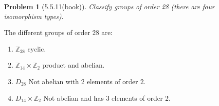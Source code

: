 \documentclass[10pt]{article}
\newcommand{\sk}{\vskip 10mm}
\newcommand{\bb}[1]{\mathbb{#1}}
\theoremstyle{plain}
\newtheorem{problem}{Problem}
\theoremstyle{remark}
\begin{document}
\begin{problem}[5.5.11(book)]
  Classify groups of order 28 (there are four isomorphism types).
\end{problem}

The different groups of order 28 are:
\begin{enumerate}
\item $\bb{Z}_{28}$ cyclic.
\item $\bb{Z}_{14}\times \bb{Z}_2$ product and abelian.
\item $D_{28}$ Not abelian with $2$ elements of order $2$.
\item $D_{14}\times\bb{Z}_2$ Not abelian and has $3$ elements of order
  $2$.
\end{enumerate}

\sk

\end{document}

